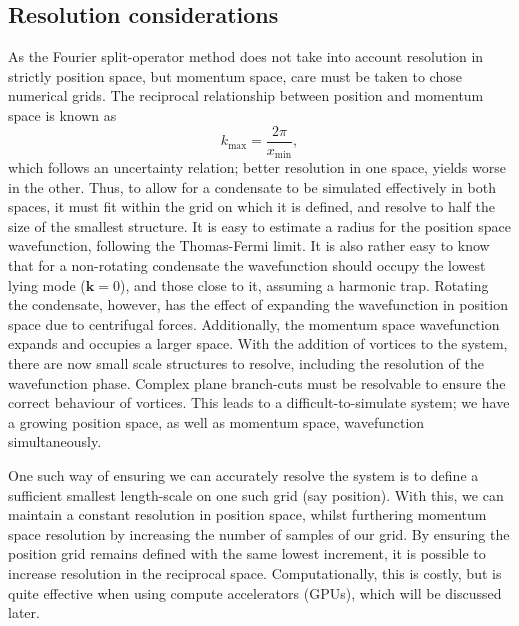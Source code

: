 \subsection{Resolution considerations}
As the Fourier split-operator method does not take into account resolution in strictly position space, but momentum space, care must be taken to chose numerical grids. The reciprocal relationship between position and momentum space is known as \begin{equation}
    k_{\text{max}} = \frac{2\pi}{x_{\text{min}}},
\end{equation}
which follows an uncertainty relation; better resolution in one space, yields worse in the other. Thus, to allow for a condensate to be simulated effectively in both spaces, it must fit within the grid on which it is defined, and resolve to half the size of the smallest structure. It is easy to estimate a radius for the position space wavefunction, following the Thomas-Fermi limit. It is also rather easy to know that for a non-rotating condensate the wavefunction should occupy the lowest lying mode ($\mathbf{k}=0$), and those close to it, assuming a harmonic trap. Rotating the condensate, however, has the effect of expanding the wavefunction in position space due to centrifugal forces. Additionally, the momentum space wavefunction expands and occupies a larger space. With the addition of vortices to the system, there are now small scale structures to resolve, including the resolution of the wavefunction phase. Complex plane branch-cuts must be resolvable to ensure the correct behaviour of vortices. This leads to a difficult-to-simulate system; we have a growing position space, as well as momentum space, wavefunction simultaneously.

One such way of ensuring we can accurately resolve the system is to define a sufficient smallest length-scale on one such grid (say position). With this, we can maintain a constant resolution in position space, whilst furthering momentum space resolution by increasing the number of samples of our grid. By ensuring the position grid remains defined with the same lowest increment, it is possible to increase resolution in the reciprocal space. Computationally, this is costly, but is quite effective when using compute accelerators (GPUs), which will be discussed later. %

